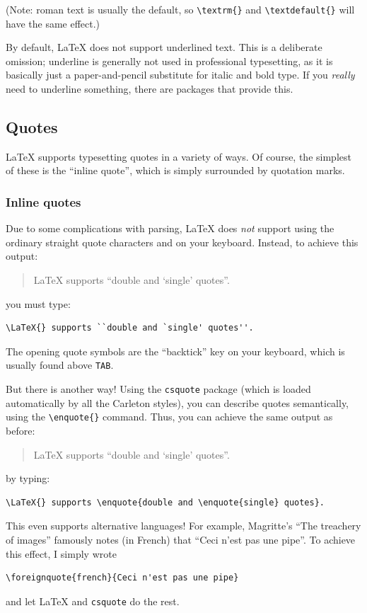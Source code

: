 \documentclass{article}
\newcommand*{\code}[1]{\texttt{#1}}
\begin{document}
(Note: roman text is usually the default, so \code{\textbackslash{}textrm\{\}} and \code{\textbackslash{}textdefault\{\}} will have the same effect.)

By default, \LaTeX{} does not support underlined text.
This is a deliberate omission; underline is generally not used in professional typesetting, as it is basically just a paper-and-pencil substitute for italic and bold type.
If you \emph{really} need to underline something, there are packages that provide this.

\subsection{Quotes}
\label{s:quotes}
\LaTeX{} supports typesetting quotes in a variety of ways.
Of course, the simplest of these is the \enquote{inline quote}, which is simply surrounded by quotation marks.

\subsubsection{Inline quotes}
\label{s:inlinequotes}
Due to some complications with parsing, \LaTeX{} does \emph{not} support using the ordinary straight quote characters \code{\textquotedbl} and \code{\textquotesingle} on your keyboard.
Instead, to achieve this output:
\begin{quote}
  \LaTeX{} supports ``double and `single' quotes''.
\end{quote}
you must type:
\begin{verbatim}
\LaTeX{} supports ``double and `single' quotes''.
\end{verbatim}
The opening quote symbols are the \enquote{backtick} key on your keyboard, which is usually found above \code{TAB}.

But there is another way!
Using the \code{csquote} package (which is loaded automatically by all the Carleton styles), you can describe quotes semantically, using the \code{\textbackslash{}enquote\{\}} command.
Thus, you can achieve the same output as before:
\begin{quote}
  \LaTeX{} supports \enquote{double and \enquote{single} quotes}.
\end{quote}
by typing:
\begin{verbatim}
\LaTeX{} supports \enquote{double and \enquote{single} quotes}.
\end{verbatim}

This even supports alternative languages!
For example, Magritte's \enquote{The treachery of images} famously notes (in French) that \foreignquote{french}{Ceci n'est pas une pipe}.
To achieve this effect, I simply wrote
\begin{verbatim}
\foreignquote{french}{Ceci n'est pas une pipe}
\end{verbatim}
and let \LaTeX{} and \code{csquote} do the rest.
\end{document}
